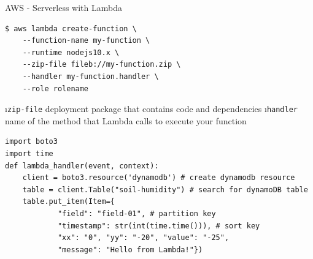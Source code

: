\begin{frame}{AWS - Serverless with Lambda}
\begin{lstlisting}
$ aws lambda create-function \
    --function-name my-function \
    --runtime nodejs10.x \
    --zip-file fileb://my-function.zip \
    --handler my-function.handler \
    --role rolename
\end{lstlisting}
\i \lstinline{zip-file} deployment package that contains code and dependencies
\i \lstinline{handler} name of the method that Lambda calls to execute your function

\begin{lstlisting}
import boto3
import time
def lambda_handler(event, context):
    client = boto3.resource('dynamodb') # create dynamodb resource
    table = client.Table("soil-humidity") # search for dynamoDB table
    table.put_item(Item={
            "field": "field-01", # partition key
            "timestamp": str(int(time.time())), # sort key
            "xx": "0", "yy": "-20", "value": "-25",
            "message": "Hello from Lambda!"})
\end{lstlisting}
\end{frame}




